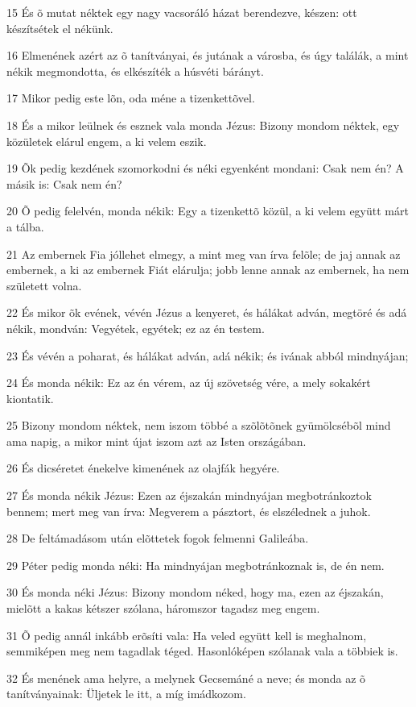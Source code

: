 \par 15 És õ mutat néktek egy nagy vacsoráló házat berendezve, készen: ott készítsétek el nékünk.
\par 16 Elmenének azért az õ tanítványai, és jutának a városba, és úgy találák, a mint nékik megmondotta, és elkészíték a húsvéti bárányt.
\par 17 Mikor pedig este lõn, oda méne a tizenkettõvel.
\par 18 És a mikor leülnek és esznek vala monda Jézus: Bizony mondom néktek, egy közületek elárul engem, a ki velem eszik.
\par 19 Õk pedig kezdének szomorkodni és néki egyenként mondani: Csak nem én? A másik is: Csak nem én?
\par 20 Õ pedig felelvén, monda nékik: Egy a tizenkettõ közül, a ki velem együtt márt a tálba.
\par 21 Az embernek Fia jóllehet elmegy, a mint meg van írva felõle; de jaj annak az embernek, a ki az embernek Fiát elárulja; jobb lenne annak az embernek, ha nem született volna.
\par 22 És mikor õk evének, vévén Jézus a kenyeret, és hálákat adván, megtöré és adá nékik, mondván: Vegyétek, egyétek; ez az én testem.
\par 23 És vévén a poharat, és hálákat adván, adá nékik; és ivának abból mindnyájan;
\par 24 És monda nékik: Ez az én vérem, az új szövetség vére, a mely sokakért kiontatik.
\par 25 Bizony mondom néktek, nem iszom többé a szõlõtõnek gyümölcsébõl mind ama napig, a mikor mint újat iszom azt az Isten országában.
\par 26 És dicséretet énekelve kimenének az olajfák hegyére.
\par 27 És monda nékik Jézus: Ezen az éjszakán mindnyájan megbotránkoztok bennem; mert meg van írva: Megverem  a pásztort, és elszélednek a juhok.
\par 28 De feltámadásom után elõttetek fogok felmenni Galileába.
\par 29 Péter pedig monda néki: Ha mindnyájan megbotránkoznak is, de én nem.
\par 30 És monda néki Jézus: Bizony mondom néked, hogy ma, ezen az éjszakán, mielõtt a kakas  kétszer szólana, háromszor tagadsz meg engem.
\par 31 Õ pedig annál inkább erõsíti vala: Ha veled együtt kell is meghalnom, semmiképen meg nem tagadlak téged. Hasonlóképen szólanak vala a többiek is.
\par 32 És menének ama helyre, a melynek Gecsemáné a neve; és monda az õ tanítványainak: Üljetek le itt, a míg imádkozom.
